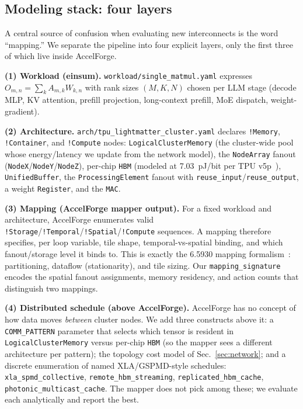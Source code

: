 \documentclass[conference]{IEEEtran}
\newcommand{\code}[1]{\texttt{\scriptsize #1}}
\newcommand{\pjbit}{pJ/bit}
\newcommand{\secref}[1]{Sec.~\ref{#1}}
\begin{document}
\subsection{Modeling stack: four layers}
\label{sec:stack}
A central source of confusion when evaluating new interconnects is
the word ``mapping.'' We separate the pipeline into four explicit
layers, only the first three of which live inside AccelForge.

\textbf{(1) Workload (einsum).}
\code{workload/single\_matmul.yaml} expresses
$O_{m,n}=\sum_k A_{m,k}W_{k,n}$ with rank sizes $(M,K,N)$ chosen
per LLM stage (decode MLP, KV attention, prefill projection,
long-context prefill, MoE dispatch, weight-gradient).

\textbf{(2) Architecture.}
\code{arch/tpu\_lightmatter\_cluster.yaml} declares
\code{!Memory}, \code{!Container}, and \code{!Compute} nodes:
\code{LogicalClusterMemory} (the cluster-wide pool whose
energy/latency we update from the network model), the
\code{NodeArray} fanout (\code{NodeX}/\code{NodeY}/\code{NodeZ}),
per-chip \code{HBM} (modeled at 7.03~\pjbit{} per
TPU v5p~\cite{tpuv5p}), \code{UnifiedBuffer}, the
\code{ProcessingElement} fanout with
\code{reuse\_input}/\code{reuse\_output}, a weight \code{Register},
and the \code{MAC}.

\textbf{(3) Mapping (AccelForge mapper output).} For a fixed
workload and architecture, AccelForge enumerates valid
\code{!Storage}/\code{!Temporal}/\code{!Spatial}/\code{!Compute}
sequences. A mapping therefore specifies, per loop variable, tile
shape, temporal-vs-spatial binding, and which fanout/storage level it
binds to. This is exactly the 6.5930 mapping
formalism~\cite{lec05-mapping,lec06-partitioning}: partitioning,
dataflow (stationarity), and tile sizing. Our \code{mapping\_signature}
encodes the spatial fanout assignments, memory residency, and action
counts that distinguish two mappings.

\textbf{(4) Distributed schedule (above AccelForge).} AccelForge has
no concept of how data moves \emph{between} cluster nodes. We add
three constructs above it: a \code{COMM\_PATTERN} parameter that
selects which tensor is resident in
\code{LogicalClusterMemory} versus per-chip \code{HBM} (so the mapper
sees a different architecture per pattern); the topology cost model
of \secref{sec:network}; and a discrete enumeration of named
XLA/GSPMD-style schedules: \texttt{xla\_spmd\_collective},
\texttt{remote\_hbm\_streaming}, \texttt{replicated\_hbm\_cache},
\texttt{photonic\_multicast\_cache}. The mapper does not pick among
these; we evaluate each analytically and report the best.
\end{document}
